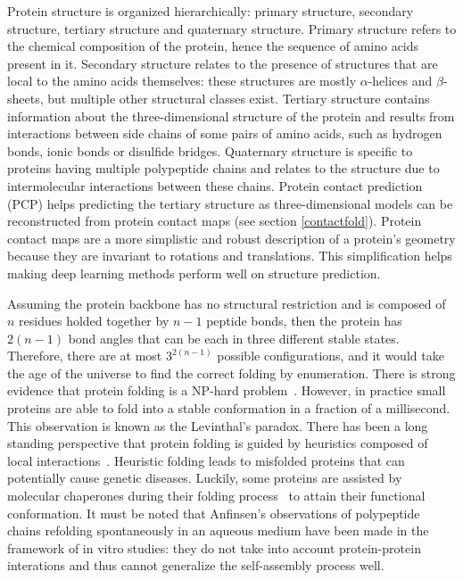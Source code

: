     Protein structure is organized hierarchically: primary structure, secondary structure, tertiary structure
    and quaternary structure. Primary structure refers to the chemical composition of the protein, hence the sequence of amino acids present in it.
    Secondary structure relates to the presence of structures that are local to the amino acids themselves:
    these structures are mostly $\alpha$-helices
    and $\beta$-sheets, but multiple other structural classes exist.
    Tertiary structure contains information about the three-dimensional
    structure of the protein and results from interactions
    between side chains of some pairs of amino acids, such as hydrogen bonds, ionic bonds or disulfide bridges.
    Quaternary structure is specific to proteins having multiple polypeptide
    chains and relates to the structure due to intermolecular interactions between
    these chains. Protein contact prediction (PCP) helps predicting the tertiary structure as three-dimensional
    models can be reconstructed from protein contact maps (see section \ref{contactfold}).
    Protein contact maps are a more simplistic and robust description of a protein's geometry
    because they are invariant to rotations and translations.
    This simplification helps making deep learning methods perform well on structure prediction.

    Assuming the protein backbone has no structural restriction and is composed of $n$ residues holded together by $n-1$ peptide bonds,
    then the protein has $2(n-1)$ bond angles that can be each in three different stable states. Therefore, there are at most
    $3^{2(n-1)}$ possible configurations, and it would take the age of the universe to find the correct folding by enumeration.
    There is strong evidence that protein folding is a NP-hard problem~\cite{hart1997robust}.
    However, in practice small proteins are able to fold into a stable conformation in a fraction of a millisecond.
    This observation is known as the Levinthal's paradox. There has been a long standing perspective that protein folding
    is guided by heuristics composed of local interactions~\cite{levinthal1969fold}. Heuristic folding leads to misfolded proteins
    that can potentially cause genetic diseases.
    Luckily, some proteins are assisted by molecular chaperones during their folding process~\cite{ellis1991molecular}
    to attain their functional conformation. It must be noted that Anfinsen's observations of polypeptide chains refolding
    spontaneously in an aqueous medium have been made in the framework of in vitro studies:
    they do not take into account protein-protein interations and thus cannot generalize the self-assembly process well.

